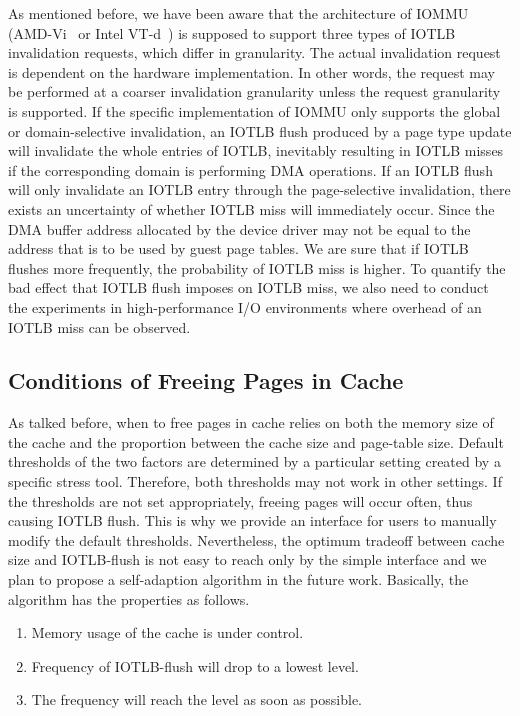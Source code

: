 As mentioned before, we have been aware that the architecture of IOMMU (AMD-Vi~\cite{amdvt} or Intel VT-d~\cite{intelvt}) is supposed to support three types of IOTLB invalidation requests, which differ in granularity. The actual invalidation request is dependent on the hardware implementation. In other words, the request may be performed at a coarser invalidation granularity unless the request granularity is supported. If the specific implementation of IOMMU only supports the global or domain-selective invalidation, an IOTLB flush produced by a page type update will invalidate the whole entries of IOTLB, inevitably resulting in IOTLB misses if the corresponding domain is performing DMA operations. If an IOTLB flush will only invalidate an IOTLB entry through the page-selective invalidation, there exists an uncertainty of whether IOTLB miss will immediately occur. Since the DMA buffer address allocated by the device driver may not be equal to the address that is to be used by guest page tables. We are sure that if IOTLB flushes more frequently, the probability of IOTLB miss is higher. To quantify the bad effect that IOTLB flush imposes on IOTLB miss, we also need to conduct the experiments in high-performance I/O environments where overhead of an IOTLB miss can be observed.

\subsection{Conditions of Freeing Pages in Cache}

As talked before, when to free pages in cache relies on both the memory size of the cache and the proportion between the cache size and page-table size. Default thresholds of the two factors are determined by a particular setting created by a specific stress tool. Therefore, both thresholds may not work in other settings. If the thresholds are not set appropriately, freeing pages will occur often, thus causing IOTLB flush. This is why we provide an interface for users to manually modify the default thresholds. Nevertheless, the optimum tradeoff between cache size and IOTLB-flush is not easy to reach only by the simple interface and we plan to propose a self-adaption algorithm in the future work. Basically, the algorithm has the properties as follows.
\begin{enumerate}
\item Memory usage of the cache is under control.
\item Frequency of IOTLB-flush will drop to a lowest level.
\item The frequency will reach the level as soon as possible.
\end{enumerate}

